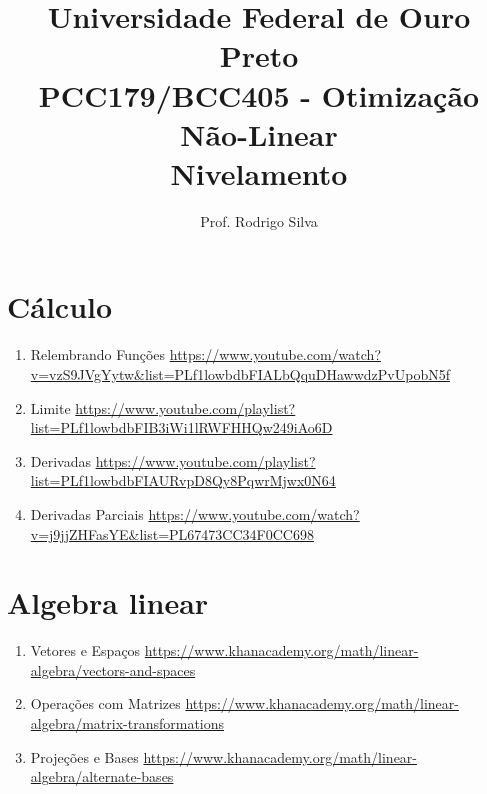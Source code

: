 \documentclass{article}
\title{\vspace{-2 cm}Universidade Federal de Ouro Preto \\ PCC179/BCC405 - Otimização Não-Linear \\ Nivelamento}
\author{Prof. Rodrigo Silva}
\date{}
\begin{document}
\maketitle



\section{Cálculo}

\begin{enumerate}
    \item Relembrando Funções \url{https://www.youtube.com/watch?v=vzS9JVgYytw&list=PLf1lowbdbFIALbQquDHawwdzPvUpobN5f}
    \item Limite \url{https://www.youtube.com/playlist?list=PLf1lowbdbFIB3iWi1lRWFHHQw249iAo6D}
    \item Derivadas \url{https://www.youtube.com/playlist?list=PLf1lowbdbFIAURvpD8Qy8PqwrMjwx0N64}
    \item Derivadas Parciais \url{https://www.youtube.com/watch?v=j9jjZHFasYE&list=PL67473CC34F0CC698}
\end{enumerate}

\section{Algebra linear}

\begin{enumerate}
    \item Vetores e Espaços \url{https://www.khanacademy.org/math/linear-algebra/vectors-and-spaces}
    \item Operações com Matrizes \url{https://www.khanacademy.org/math/linear-algebra/matrix-transformations}
    \item Projeções e Bases \url{https://www.khanacademy.org/math/linear-algebra/alternate-bases}
\end{enumerate}

%
%
\end{document}
